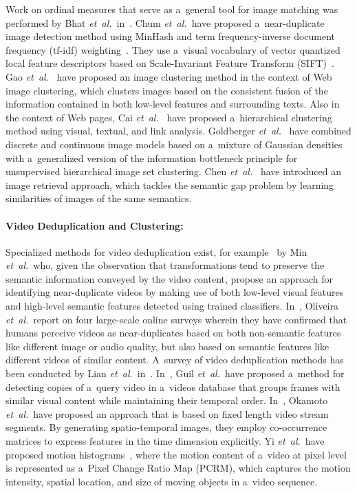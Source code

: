 Work on ordinal measures that serve as a~general tool for
image matching was performed by Bhat \emph{et~al.}\
in~\cite{bhat1998imagecorrespondence}.
Chum \emph{et~al.}\ have proposed a~near-duplicate image detection method
using MinHash and term frequency-inverse document frequency (tf-idf)
weighting~\cite{chum2008nearduplicate}.
They use a~visual vocabulary of vector quantized local feature descriptors based on
Scale-Invariant Feature Transform (SIFT)~\cite{lowe1999sift}.
Gao \emph{et~al.}\ \cite{gao2005webimageclustering} have proposed an image clustering method
in the context of Web image clustering, which clusters images
based on the consistent fusion of the information contained in
both low-level features and surrounding texts.
Also in the context of Web pages, Cai
\emph{et~al.}\ \cite{cai2004hierarchicalclustering} have proposed
a~hierarchical clustering method using visual, textual, and link analysis.
Goldberger \emph{et~al.}\ \cite{goldberger2006unsupervisedclustering} 
have combined discrete and continuous image models based on a~mixture of Gaussian densities
with a~generalized version of the information bottleneck principle
for unsupervised hierarchical image set clustering. 
Chen \emph{et~al.}\ \cite{chen2003cbir} have introduced an image retrieval approach,
which tackles the semantic gap problem by learning similarities
of images of the same semantics.

\paragraph{Video Deduplication and Clustering:}

Specialized methods for video deduplication exist,
for example~\cite{min2011nearduplicatevideo,wu2009nearduplicate}
by Min \emph{et~al.}\ who, given the observation that 
transformations tend to preserve the semantic information conveyed
by the video content, propose an approach for identifying
near-duplicate videos by making use of both low-level visual
features and high-level semantic features
detected using trained classifiers.
In~\cite{oliveira2010nearduplicate}, Oliveira
\emph{et~al.}\ report on four large-scale online surveys
wherein they have confirmed that humans perceive videos as near-duplicates
based on both non-semantic features like different image or audio
quality, but also based on semantic features like different
videos of similar content.
A~survey of video deduplication methods has been conducted by
Lian \emph{et~al.}\ in~\cite{lian2010survey}.
In~\cite{guil2007clustering}, Guil \emph{et~al.}\ have proposed a~method
for detecting copies of a~query video in a~videos database
that groups frames with similar visual content while maintaining their temporal order.
In~\cite{okamoto2002videoclustering}, Okamoto \emph{et~al.}\  have proposed an approach
that is based on fixed length video stream segments.
By generating spatio-temporal images, they employ co-occurrence matrices
to express features in the time dimension explicitly. 
Yi \emph{et~al.}\ have proposed motion histograms~\cite{yi2005motionhistogram},
where the motion content of a~video at pixel level is represented
as a~Pixel Change Ratio Map (PCRM), which captures the motion intensity,
spatial location, and size of moving objects in a~video sequence. 

